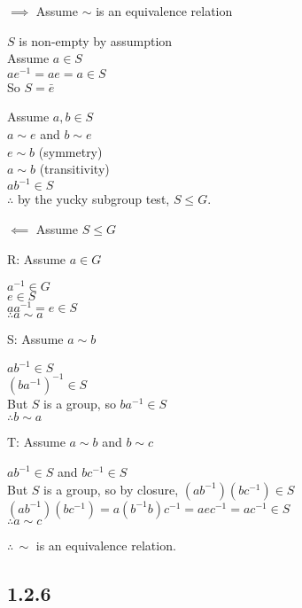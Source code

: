 \documentclass[letterpaper,12pt,fleqn]{article}
\renewcommand{\r}{\sim}
\begin{document}
\begin{description}
\item $\implies$ Assume $\r$ is an equivalence relation

  $S$ is non-empty by assumption \\
  Assume $a\in S$ \\
  $ae^{-1}=ae=a\in S$ \\
  So $S=\bar{e}$

  Assume $a,b\in S$ \\
  $a\r e$ and $b\r e$ \\
  $e\r b$ (symmetry) \\
  $a\r b$ (transitivity) \\
  $ab^{-1}\in S$ \\
  $\therefore$ by the yucky subgroup test, $S\le G$.
  
\item $\impliedby$ Assume $S\le G$

  \begin{description}
  \item R: Assume $a\in G$

    $a^{-1}\in G$ \\
    $e\in S$ \\
    $aa^{-1}=e\in S$ \\
    $\therefore a\r a$

  \item S: Assume $a\r b$

    $ab^{-1}\in S$ \\
    $(ba^{-1})^{-1}\in S$ \\
    But $S$ is a group, so $ba^{-1}\in S$ \\
    $\therefore b\r a$

  \item T: Assume $a\r b$ and $b\r c$

    $ab^{-1}\in S$ and $bc^{-1}\in S$ \\
    But $S$ is a group, so by closure, $(ab^{-1})(bc^{-1})\in S$ \\
    $(ab^{-1})(bc^{-1})=a(b^{-1}b)c^{-1}=aec^{-1}=ac^{-1}\in S$ \\
    $\therefore a\r c$
  \end{description}
  $\therefore\,\r$ is an equivalence relation.
\end{description}

\subsection*{1.2.6}
\end{document}
